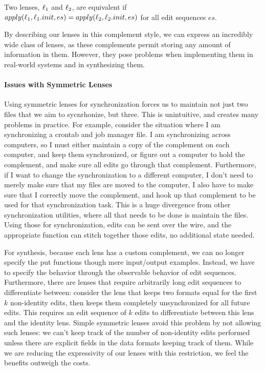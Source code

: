 \documentclass[acmsmall,screen,anonymous]{acmart}
\begin{document}
Two lenses, $\mathit{\ell}_1$ and $\mathit{\ell}_2$, are equivalent if
$apply(\mathit{\ell}_1,\mathit{\ell}_1.init,es) = apply(\mathit{\ell}_2,\mathit{\ell}_2.init,es)$ for all edit
sequences $es$.

By describing our lenses in this complement style, we can express an incredibly
wide class of lenses, as these complements permit storing any amount of
information in them.  However, they pose problems when implementing them in
real-world systems and in synthesizing them.

\paragraph*{Issues with Symmetric Lenses} Using symmetric lenses for
synchronization forces us to maintain not just two files that we aim to
sycnrhonize, but three. This is unintuitive, and creates many problems in
practice. For example, consider the situation where I am synchronizing a crontab
and job manager file. I am synchronizing across computers, so I must either
maintain a copy of the complement on each computer, and keep them synchronized,
or figure out a computer to hold the complement, and make sure all edits go
through that complement. Furthermore, if I want to change the synchronization to
a different computer, I don't need to merely make sure that my files are moved
to the computer, I also have to make sure that I correctly move the complement,
and hook up that complement to be used for that synchronization task. This is a
huge divergence from other synchronization utilities, where all that needs to be
done is maintain the files. Using those for synchronization, edits can be sent
over the wire, and the appropriate function can stitch together those edits, no
additional state needed.

For synthesis, because each lens has a custom complement, we can no longer
specify the put functions though mere input/output examples.  Instead, we have
to specify the behavior through the observable behavior of edit sequences.
Furthermore, there are lenses that require arbitrarily long edit sequences to
differentiate between: consider the lens that keeps two formats equal for the
first $k$ non-identity edits, then keeps them completely unsynchronized for all
future edits.  This requires an edit sequence of $k$ edits to differentiate
between this lens and the identity lens.  Simple symmetric lenses avoid this
problem by not allowing such lenses: we can't keep track of the number of
non-identity edits performed unless there are explicit fields in the data
formats keeping track of them.  While we are reducing the expressivity of our
lenses with this restriction, we feel the benefits outweigh the costs.
\end{document}
